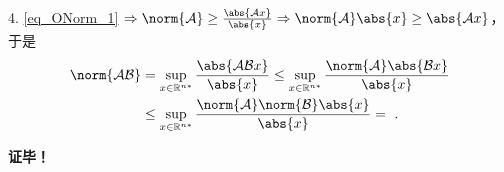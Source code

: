 4. \autoref{eq_ONorm_1} $\Rightarrow\norm{\mathcal A}\geq\frac{\abs{\mathcal Ax}}{\abs{x}}\Rightarrow \norm{\mathcal A}\abs{x}\geq\abs{\mathcal A x}$，于是
\begin{equation}
\begin{aligned}
\norm{\mathcal{AB}}&=\sup\limits_{x\in{\mathbb R^{n*}}}\frac{\abs{\mathcal{AB} x}}{\abs{x}}\leq\sup\limits_{x\in{\mathbb R^{n*}}}\frac{\norm{\mathcal A}\abs{\mathcal{B} x}}{\abs{x}}\\
&\leq\sup\limits_{x\in{\mathbb R^{n*}}}\frac{\norm{\mathcal A}\norm{\mathcal B}\abs{x}}{\abs{x}}=~.
\end{aligned}
\end{equation}


\textbf{证毕！}
